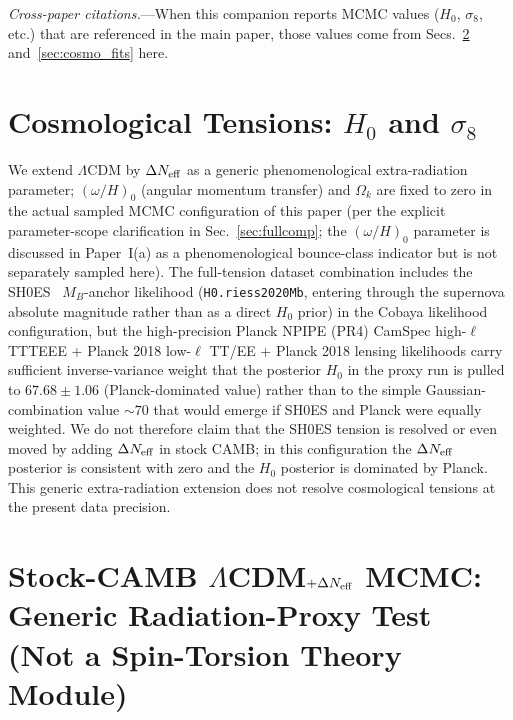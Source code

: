 \documentclass[aps,prd,twocolumn,superscriptaddress,showpacs,preprintnumbers,nofootinbib,longbibliography,floatfix]{revtex4-2}
\newcommand{\Neff}{N_{\rm eff}}
\begin{document}
\textit{Cross-paper citations.}---When this companion reports MCMC values
($H_0$, $\sigma_8$, etc.) that are referenced in the main paper, those
values come from Secs.~\ref{sec:verification} and~\ref{sec:cosmo_fits} here.


\section{Cosmological Tensions: $H_0$ and $\sigma_8$}\label{sec:tensions}

We extend $\Lambda$CDM by $\Delta\Neff$ as a generic phenomenological
extra-radiation parameter; $(\omega/H)_0$
(angular momentum transfer) and $\Omega_k$ are fixed to zero in the actual
sampled MCMC configuration of this paper (per the explicit
parameter-scope clarification in Sec.~\ref{sec:fullcomp}; the
$(\omega/H)_0$ parameter is discussed in Paper~I(a) as a phenomenological
bounce-class indicator but is not separately sampled here).
The full-tension dataset combination includes the SH0ES~\cite{Riess2022}
$M_B$-anchor likelihood (\texttt{H0.riess2020Mb}, entering through the
supernova absolute magnitude rather than as a direct $H_0$ prior) in the
Cobaya likelihood configuration, but the
high-precision Planck NPIPE (PR4) CamSpec high-$\ell$ TTTEEE + Planck 2018
low-$\ell$ TT/EE + Planck 2018 lensing likelihoods
carry sufficient inverse-variance weight that the posterior $H_0$ in
the proxy run is pulled to $67.68 \pm 1.06$ (Planck-dominated value)
rather than to the simple Gaussian-combination value $\sim 70$ that
would emerge if SH0ES and Planck were equally weighted. We do not
therefore claim that the SH0ES tension is resolved or even moved by
adding $\Delta\Neff$ in stock CAMB; in this configuration the
$\Delta\Neff$ posterior is consistent with zero and the
$H_0$ posterior is dominated by Planck. This generic extra-radiation
extension does not resolve cosmological tensions at the present data
precision.


\section{Stock-CAMB $\Lambda$CDM$+\Delta\Neff$ MCMC: Generic Radiation-Proxy Test\\
(Not a Spin-Torsion Theory Module)}\label{sec:verification}
\end{document}
